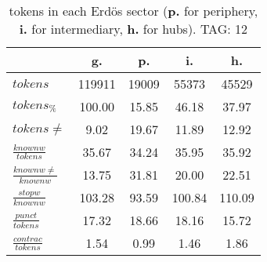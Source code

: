 \begin{table}[h!]
\begin{center}
\begin{tabular}{| l || c | c | c | c |}\hline
 & {\bf g.} & {\bf p.} & {\bf i.} & {\bf h.} \\\hline\hline
$tokens$ & 119911  & 19009  & 55373  & 45529 \\
$tokens_{\%}$ & 100.00  & 15.85  & 46.18  & 37.97 \\
$tokens \neq$ & 9.02  & 19.67  & 11.89  & 12.92 \\\hline
$\frac{knownw}{tokens}$ & 35.67  & 34.24  & 35.95  & 35.92 \\
$\frac{knownw \neq}{knownw}$ & 13.75  & 31.81  & 20.00  & 22.51 \\\hline
$\frac{stopw}{knownw}$ & 103.28  & 93.59  & 100.84  & 110.09 \\
$\frac{punct}{tokens}$ & 17.32  & 18.66  & 18.16  & 15.72 \\
$\frac{contrac}{tokens}$ & 1.54  & 0.99  & 1.46  & 1.86 \\\hline
\end{tabular}
\caption{tokens in each Erd\"os sector ({{\bf p.}} for periphery, {{\bf i.}} for intermediary, 
    {{\bf h.}} for hubs). TAG: 12}
\end{center}
\end{table}